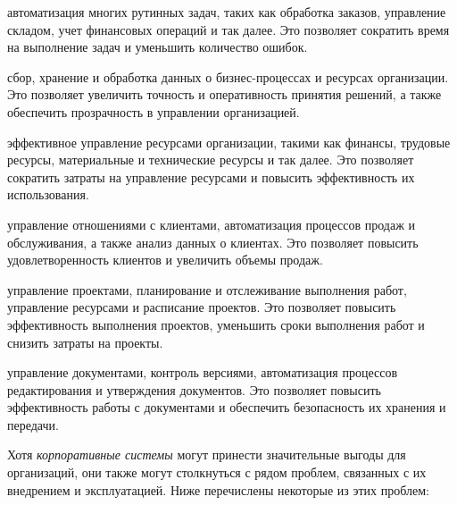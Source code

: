 \begin{textitemize}
    \item автоматизация многих рутинных задач, таких как обработка заказов, управление складом, учет финансовых операций и так далее. Это позволяет сократить время на выполнение задач и уменьшить количество ошибок.
    \item сбор, хранение и обработка данных о бизнес-процессах и ресурсах организации. Это позволяет увеличить точность и оперативность принятия решений, а также обеспечить прозрачность в управлении организацией.
    \item эффективное управление ресурсами организации, такими как финансы, трудовые ресурсы, материальные и технические ресурсы и так далее. Это позволяет сократить затраты на управление ресурсами и повысить эффективность их использования.
    \item управление отношениями с клиентами, автоматизация процессов продаж и обслуживания, а также анализ данных о клиентах. Это позволяет повысить удовлетворенность клиентов и увеличить объемы продаж.
    \item управление проектами, планирование и отслеживание выполнения работ, управление ресурсами и расписание проектов. Это позволяет повысить эффективность выполнения проектов, уменьшить сроки выполнения работ и снизить затраты на проекты.
    \item управление документами, контроль версиями, автоматизация процессов редактирования и утверждения документов. Это позволяет повысить эффективность работы с документами и обеспечить безопасность их хранения и передачи.
\end{textitemize}

Хотя \textit{корпоративные системы} могут принести значительные выгоды для организаций, они также могут столкнуться с рядом проблем, связанных с их внедрением и эксплуатацией. Ниже перечислены некоторые из этих проблем:

